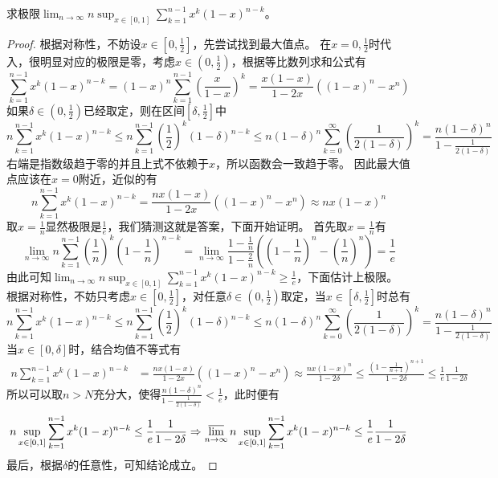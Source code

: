 \documentclass[../../main.tex]{subfiles}
\begin{document}
\begin{example}
求极限\(\lim_{n\rightarrow\infty}n\sup_{x\in[0,1]}\sum_{k = 1}^{n - 1}x^{k}(1 - x)^{n - k}\)。
\end{example}
\begin{proof}
根据对称性，不妨设\(x\in\left[0,\frac{1}{2}\right]\)，先尝试找到最大值点。
在\(x = 0,\frac{1}{2}\)时代入，很明显对应的极限是零，考虑\(x\in\left(0,\frac{1}{2}\right)\)，根据等比数列求和公式有
\[
\sum_{k = 1}^{n - 1}x^{k}(1 - x)^{n - k}=(1 - x)^{n}\sum_{k = 1}^{n - 1}\left(\frac{x}{1 - x}\right)^{k}=\frac{x(1 - x)}{1 - 2x}((1 - x)^{n}-x^{n})
\]
如果\(\delta\in\left(0,\frac{1}{2}\right)\)已经取定，则在区间\(\left[\delta,\frac{1}{2}\right]\)中
\[
n\sum_{k = 1}^{n - 1}x^{k}(1 - x)^{n - k}\leq n\sum_{k = 1}^{n - 1}\left(\frac{1}{2}\right)^{k}(1 - \delta)^{n - k}\leq n(1 - \delta)^{n}\sum_{k = 0}^{\infty}\left(\frac{1}{2(1 - \delta)}\right)^{k}=\frac{n(1 - \delta)^{n}}{1-\frac{1}{2(1 - \delta)}}
\]
右端是指数级趋于零的并且上式不依赖于\(x\)，所以函数会一致趋于零。
因此最大值点应该在\(x = 0\)附近，近似的有
\[
n\sum_{k = 1}^{n - 1}x^{k}(1 - x)^{n - k}=\frac{nx(1 - x)}{1 - 2x}((1 - x)^{n}-x^{n})\approx nx(1 - x)^{n}
\]
取\(x = \frac{1}{n}\)显然极限是\(\frac{1}{e}\)，我们猜测这就是答案，下面开始证明。
首先取\(x = \frac{1}{n}\)有
\[
\lim_{n\rightarrow\infty}n\sum_{k = 1}^{n - 1}\left(\frac{1}{n}\right)^{k}\left(1-\frac{1}{n}\right)^{n - k}=\lim_{n\rightarrow\infty}\frac{1-\frac{1}{n}}{1-\frac{2}{n}}\left(\left(1-\frac{1}{n}\right)^{n}-\left(\frac{1}{n}\right)^{n}\right)=\frac{1}{e}
\]
由此可知\(\lim_{n\rightarrow\infty}n\sup_{x\in[0,1]}\sum_{k = 1}^{n - 1}x^{k}(1 - x)^{n - k}\geq\frac{1}{e}\)，下面估计上极限。
根据对称性，不妨只考虑\(x\in\left[0,\frac{1}{2}\right]\)，对任意\(\delta\in\left(0,\frac{1}{2}\right)\)取定，当\(x\in\left[\delta,\frac{1}{2}\right]\)时总有
\[
n\sum_{k = 1}^{n - 1}x^{k}(1 - x)^{n - k}\leq n\sum_{k = 1}^{n - 1}\left(\frac{1}{2}\right)^{k}(1 - \delta)^{n - k}\leq n(1 - \delta)^{n}\sum_{k = 0}^{\infty}\left(\frac{1}{2(1 - \delta)}\right)^{k}=\frac{n(1 - \delta)^{n}}{1-\frac{1}{2(1 - \delta)}}
\]
当\(x\in[0,\delta]\)时，结合均值不等式有
\begin{align*}
n\sum_{k = 1}^{n - 1}x^{k}(1 - x)^{n - k}&=\frac{nx(1 - x)}{1 - 2x}((1 - x)^{n}-x^{n})\approx\frac{nx(1 - x)^{n}}{1 - 2\delta}\leq\frac{\left(1-\frac{1}{n + 1}\right)^{n + 1}}{1 - 2\delta}\leq\frac{1}{e}\frac{1}{1 - 2\delta}
\end{align*}
所以可以取\(n > N\)充分大，使得\(\frac{n(1 - \delta)^{n}}{1-\frac{1}{2(1 - \delta)}}<\frac{1}{e}\)，此时便有
\[
n\sup_{x\in[0,1]}\sum_{k = 1}^{n - 1}x^{k}(1 - x)^{n - k}\leq\frac{1}{e}\frac{1}{1 - 2\delta}\Rightarrow\varlimsup_{n\rightarrow\infty}n\sup_{x\in[0,1]}\sum_{k = 1}^{n - 1}x^{k}(1 - x)^{n - k}\leq\frac{1}{e}\frac{1}{1 - 2\delta}
\]
最后，根据\(\delta\)的任意性，可知结论成立。
\end{proof}
\end{document}
